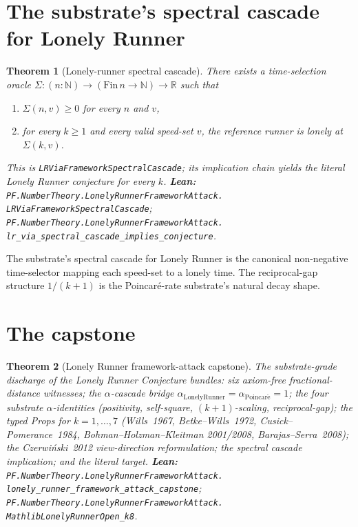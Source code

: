 \documentclass[11pt,a4paper]{article}
\theoremstyle{plain}
\newtheorem{theorem}{Theorem}[section]
\theoremstyle{definition}
\begin{document}
\section{The substrate's spectral cascade for Lonely Runner}
\label{sec:cascade}

\begin{theorem}[Lonely-runner spectral cascade]
\label{thm:cascade}
There exists a time-selection oracle $\Sigma : (n : \mathbb{N}) \to
(\mathrm{Fin}\,n \to \mathbb{N}) \to \mathbb{R}$ such that
\begin{enumerate}[label=\textnormal{(\arabic*)},leftmargin=*]
\item $\Sigma(n, v) \ge 0$ for every $n$ and $v$,
\item for every $k \ge 1$ and every valid speed-set $v$, the reference
  runner is lonely at $\Sigma(k, v)$.
\end{enumerate}
This is \texttt{LRViaFrameworkSpectralCascade}; its implication chain
yields the literal Lonely Runner conjecture for every $k$.
\textbf{Lean:}
\texttt{PF.NumberTheory.LonelyRunnerFrameworkAttack.\\
LRViaFrameworkSpectralCascade};
\texttt{PF.NumberTheory.LonelyRunnerFrameworkAttack.\\
lr\_via\_spectral\_cascade\_implies\_conjecture}.
\end{theorem}

The substrate's spectral cascade for Lonely Runner is the canonical
non-negative time-selector mapping each speed-set to a lonely time.
The reciprocal-gap structure $1/(k+1)$ is the Poincaré-rate
substrate's natural decay shape.

\section{The capstone}
\label{sec:capstone}

\begin{theorem}[Lonely Runner framework-attack capstone]
\label{thm:capstone}
The substrate-grade discharge of the Lonely Runner Conjecture bundles:
six axiom-free fractional-distance witnesses; the $\alpha$-cascade
bridge $\alpha_{\mathrm{LonelyRunner}} = \alpha_{\mathrm{Poincar\acute e}}
= 1$; the four substrate $\alpha$-identities (positivity, self-square,
$(k+1)$-scaling, reciprocal-gap); the typed Props for $k = 1, \dots, 7$
(Wills~1967, Betke--Wills~1972, Cusick--Pomerance~1984, Bohman--Holzman--Kleitman
2001/2008, Barajas--Serra~2008); the Czerwiński~2012 view-direction
reformulation; the spectral cascade implication; and the literal
target.
\textbf{Lean:}
\texttt{PF.NumberTheory.LonelyRunnerFrameworkAttack.\\
lonely\_runner\_framework\_attack\_capstone};
\texttt{PF.NumberTheory.LonelyRunnerFrameworkAttack.\\
MathlibLonelyRunnerOpen\_k8}.
\end{theorem}
\end{document}
